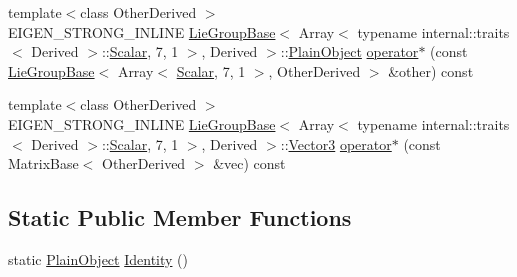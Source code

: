 \begin{DoxyCompactItemize}
\item 
{\footnotesize template$<$class Other\+Derived $>$ }\\E\+I\+G\+E\+N\+\_\+\+S\+T\+R\+O\+N\+G\+\_\+\+I\+N\+L\+I\+NE \hyperlink{class_lie_group_base}{Lie\+Group\+Base}$<$ Array$<$ typename internal\+::traits$<$ Derived $>$\+::\hyperlink{class_lie_group_base_3_01_array_3_01typename_01internal_1_1traits_3_01_derived_01_4_1_1_scalar_0d6d4b5459662fc32c7117aee50362fb1_a831695c575380c9a1df32eff9fc4a8c6}{Scalar}, 7, 1 $>$, Derived $>$\+::\hyperlink{class_lie_group_base_3_01_array_3_01typename_01internal_1_1traits_3_01_derived_01_4_1_1_scalar_0d6d4b5459662fc32c7117aee50362fb1_a950a48c9e027bcd00193aa20a59ee723}{Plain\+Object} \hyperlink{class_lie_group_base_3_01_array_3_01typename_01internal_1_1traits_3_01_derived_01_4_1_1_scalar_0d6d4b5459662fc32c7117aee50362fb1_aa20c9214eb32d0d7b51d4f1e7ee7e6e2}{operator$\ast$} (const \hyperlink{class_lie_group_base}{Lie\+Group\+Base}$<$ Array$<$ \hyperlink{class_lie_group_base_3_01_array_3_01typename_01internal_1_1traits_3_01_derived_01_4_1_1_scalar_0d6d4b5459662fc32c7117aee50362fb1_a831695c575380c9a1df32eff9fc4a8c6}{Scalar}, 7, 1 $>$, Other\+Derived $>$ \&other) const
\item 
{\footnotesize template$<$class Other\+Derived $>$ }\\E\+I\+G\+E\+N\+\_\+\+S\+T\+R\+O\+N\+G\+\_\+\+I\+N\+L\+I\+NE \hyperlink{class_lie_group_base}{Lie\+Group\+Base}$<$ Array$<$ typename internal\+::traits$<$ Derived $>$\+::\hyperlink{class_lie_group_base_3_01_array_3_01typename_01internal_1_1traits_3_01_derived_01_4_1_1_scalar_0d6d4b5459662fc32c7117aee50362fb1_a831695c575380c9a1df32eff9fc4a8c6}{Scalar}, 7, 1 $>$, Derived $>$\+::\hyperlink{class_lie_group_base_3_01_array_3_01typename_01internal_1_1traits_3_01_derived_01_4_1_1_scalar_0d6d4b5459662fc32c7117aee50362fb1_acf35a22e3543ed4824de3c19c965961c}{Vector3} \hyperlink{class_lie_group_base_3_01_array_3_01typename_01internal_1_1traits_3_01_derived_01_4_1_1_scalar_0d6d4b5459662fc32c7117aee50362fb1_a6b584aab5eef636bbf91bbfcaf03af5c}{operator$\ast$} (const Matrix\+Base$<$ Other\+Derived $>$ \&vec) const
\end{DoxyCompactItemize}
\subsection*{Static Public Member Functions}
\begin{DoxyCompactItemize}
\item 
static \hyperlink{class_lie_group_base_3_01_array_3_01typename_01internal_1_1traits_3_01_derived_01_4_1_1_scalar_0d6d4b5459662fc32c7117aee50362fb1_a950a48c9e027bcd00193aa20a59ee723}{Plain\+Object} \hyperlink{class_lie_group_base_3_01_array_3_01typename_01internal_1_1traits_3_01_derived_01_4_1_1_scalar_0d6d4b5459662fc32c7117aee50362fb1_a00b4561ff5794f6a62dbfb125c164990}{Identity} ()
\end{DoxyCompactItemize}
